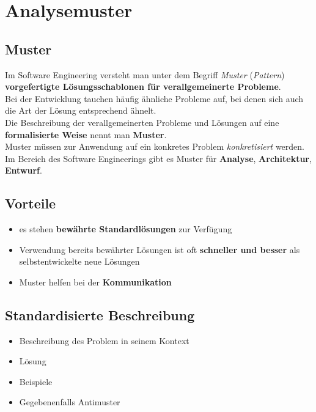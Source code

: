\section{Analysemuster}\label{sec:analysemuster}

\subsection*{Muster}
Im Software Engineering versteht man unter dem Begriff \textit{Muster} (\textit{Pattern}) \textbf{vorgefertigte Lösungsschablonen für verallgemeinerte Probleme}.\\

\noindent
Bei der Entwicklung tauchen häufig ähnliche Probleme auf, bei denen sich auch die Art der Lösung entsprechend ähnelt.\\

\noindent
Die Beschreibung der verallgemeinerten Probleme und Lösungen auf eine \textbf{formalisierte Weise} nennt man \textbf{Muster}.\\

\noindent
Muster müssen zur Anwendung auf ein konkretes Problem \textit{konkretisiert} werden.\\

\noindent
Im Bereich des Software Engineerings gibt es Muster für \textbf{Analyse}, \textbf{Architektur}, \textbf{Entwurf}.

\subsection*{Vorteile}

\begin{itemize}
    \item es stehen \textbf{bewährte Standardlösungen} zur Verfügung
    \item Verwendung bereits bewährter Lösungen ist oft \textbf{schneller und besser} als selbstentwickelte neue Lösungen
    \item Muster helfen bei der \textbf{Kommunikation}
\end{itemize}


\subsection*{Standardisierte Beschreibung}

\begin{itemize}
    \item Beschreibung des Problem in seinem Kontext
    \item Lösung
    \item Beispiele
    \item Gegebenenfalls Antimuster
\end{itemize}

